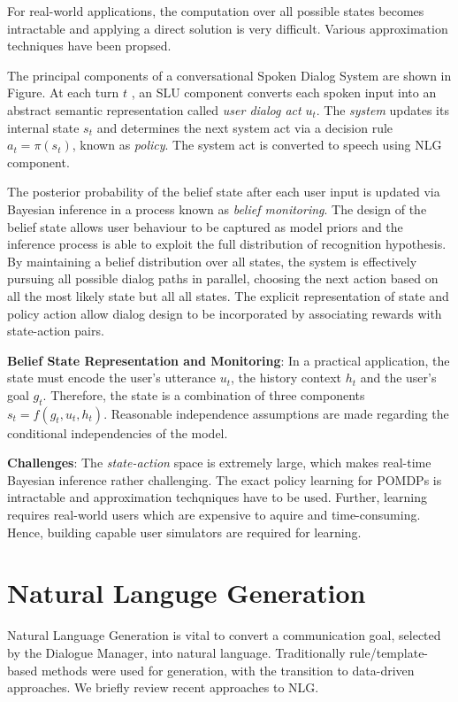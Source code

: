 \documentclass[11pt,a4paper]{article}
\begin{document}
For real-world applications, the computation over all possible states becomes intractable and applying a direct solution is very difficult. Various approximation techniques have been propsed. 

The principal components of a conversational Spoken Dialog System are shown in Figure. At each turn $t$ , an SLU component converts each spoken input into an abstract semantic representation called \textit{user dialog act} $u_t$. The \textit{system} updates its internal state $s_t$ and determines the next system act via a decision rule $a_t = \pi(s_t)$, known as \textit{policy}. The system act is converted to speech using NLG component.

The posterior probability of the belief state after each user input is updated via Bayesian inference in a process known as \textit{belief monitoring}. The design of the belief state allows user behaviour to be captured as model priors and the inference process is able to exploit the full distribution of recognition hypothesis. By maintaining a belief distribution over all states, the system is effectively pursuing all possible dialog paths in parallel, choosing the next action based on all the most likely state but all all states. The explicit representation of state and policy action allow dialog design to be incorporated by associating rewards with state-action pairs.

\smallskip \noindent \textbf{Belief State Representation and Monitoring}:
In a practical application, the state must encode the user's utterance $u_t$, the history context $h_t$ and the user's goal $g_t$. Therefore, the state is a combination of three components $s_t = f(g_t, u_t, h_t)$. Reasonable independence assumptions are made regarding the conditional independencies of the model.

\smallskip \noindent \textbf{Challenges}: The \textit{state-action} space is extremely large, which makes real-time Bayesian inference rather challenging. The exact policy learning for POMDPs is intractable and approximation techqniques have to be used. Further, learning requires real-world users which are expensive to aquire and time-consuming. Hence, building capable user simulators are required for learning.

\section{Natural Languge Generation}

Natural Language Generation is vital to convert a communication goal, selected by the Dialogue Manager, into natural language. Traditionally rule/template-based methods were used for generation, with the transition to data-driven approaches. We briefly review recent approaches to NLG.
\end{document}
